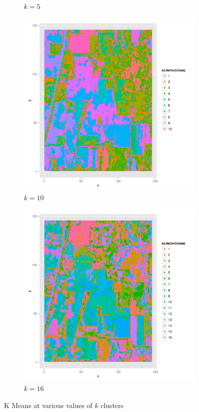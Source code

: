 \documentclass[10pt,letterpaper]{article}
\begin{document}
\begin{figure}
\begin{center}
\begin{subfigure}[b]{0.24\textwidth}
\caption{$k=5$}
\end{subfigure}
\begin{subfigure}[b]{0.24\textwidth}
\includegraphics[width=\textwidth]{../Presentation/km10.png}
\caption{$k=10$}
\end{subfigure}
\begin{subfigure}[b]{0.24\textwidth}
\includegraphics[width=\textwidth]{../Presentation/km16.png}
\caption{$k=16$}
\end{subfigure}
\caption{K Means at various values of $k$ clusters}
\end{center}
\end{figure}
\end{document}
